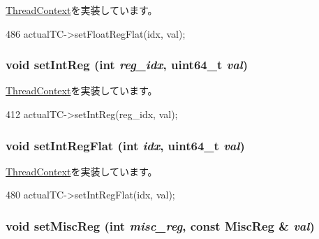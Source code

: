 \hyperlink{classThreadContext_a01392cdc362f9d589f90e57bcc519623}{ThreadContext}を実装しています。


\begin{DoxyCode}
486     { actualTC->setFloatRegFlat(idx, val); }
\end{DoxyCode}
\hypertarget{classProxyThreadContext_abc264e8ee37c6bd7d7b5759b97c34356}{
\subsubsection[{setIntReg}]{\setlength{\rightskip}{0pt plus 5cm}void setIntReg (int {\em reg\_\-idx}, \/  uint64\_\-t {\em val})}}
\label{classProxyThreadContext_abc264e8ee37c6bd7d7b5759b97c34356}


\hyperlink{classThreadContext_a995ac11ab79af59e135d473df10c72da}{ThreadContext}を実装しています。


\begin{DoxyCode}
412     { actualTC->setIntReg(reg_idx, val); }
\end{DoxyCode}
\hypertarget{classProxyThreadContext_ae3b8c9c2c1ae95767f0703357957a3f8}{
\subsubsection[{setIntRegFlat}]{\setlength{\rightskip}{0pt plus 5cm}void setIntRegFlat (int {\em idx}, \/  uint64\_\-t {\em val})}}
\label{classProxyThreadContext_ae3b8c9c2c1ae95767f0703357957a3f8}


\hyperlink{classThreadContext_a017c099cd6087484b0eb1892809b0572}{ThreadContext}を実装しています。


\begin{DoxyCode}
480     { actualTC->setIntRegFlat(idx, val); }
\end{DoxyCode}
\hypertarget{classProxyThreadContext_a1877dde4f3eb17a8b7d33ea40176c148}{
\subsubsection[{setMiscReg}]{\setlength{\rightskip}{0pt plus 5cm}void setMiscReg (int {\em misc\_\-reg}, \/  const {\bf MiscReg} \& {\em val})}}
\label{classProxyThreadContext_a1877dde4f3eb17a8b7d33ea40176c148}


